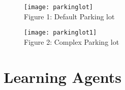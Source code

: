 \documentclass[letterpaper]{article}
\begin{document}
\begin{figure}[h]
\begin{center}
\texttt{[image: parkinglot]}\\
\small{Figure 1: Default Parking lot}
\end{center}
\end{figure}

\begin{figure}
\begin{center}
\texttt{[image: parkinglot1]}\\
\small{Figure 2: Complex Parking lot}
\end{center}
\end{figure}

\section{Learning Agents}
\end{document}
